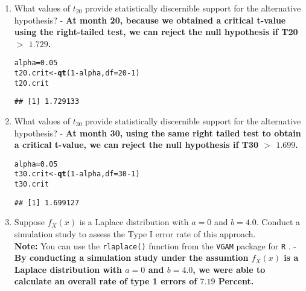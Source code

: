 \documentclass{article}\usepackage[]{graphicx}\usepackage[]{xcolor}
\makeatletter
\newcommand{\hlnum}[1]{\textcolor[rgb]{0.686,0.059,0.569}{#1}}%
\newcommand{\hlopt}[1]{\textcolor[rgb]{0,0,0}{#1}}%
\newcommand{\hldef}[1]{\textcolor[rgb]{0.345,0.345,0.345}{#1}}%
\newcommand{\hlkwb}[1]{\textcolor[rgb]{0.69,0.353,0.396}{#1}}%
\newcommand{\hlkwc}[1]{\textcolor[rgb]{0.333,0.667,0.333}{#1}}%
\newcommand{\hlkwd}[1]{\textcolor[rgb]{0.737,0.353,0.396}{\textbf{#1}}}%
\newenvironment{kframe}{%
 \def\at@end@of@kframe{}%
 \ifinner\ifhmode%
  \def\at@end@of@kframe{\end{minipage}}%
  \begin{minipage}{\columnwidth}%
 \fi\fi%
 \def\FrameCommand##1{\hskip\@totalleftmargin \hskip-\fboxsep
 \colorbox{shadecolor}{##1}\hskip-\fboxsep
     \hskip-\linewidth \hskip-\@totalleftmargin \hskip\columnwidth}%
 \MakeFramed {\advance\hsize-\width
   \@totalleftmargin\z@ \linewidth\hsize
   \@setminipage}}%
 {\par\unskip\endMakeFramed%
 \at@end@of@kframe}
\newenvironment{knitrout}{}{} %
\makeatother
\begin{document}
\begin{enumerate}
\begin{enumerate}
  \item What values of $t_{20}$ provide statistically discernible support for the
  alternative hypothesis? - \textbf{At month 20, because we obtained a critical t-value using the right-tailed test, we can reject the null hypothesis if T20 $>$ $1.729$.}
\begin{knitrout}\scriptsize
{}\color{fgcolor}\begin{kframe}
\begin{alltt}
\hldef{alpha} \hlkwb{=} \hlnum{0.05}
\hldef{t20.crit} \hlkwb{<-} \hlkwd{qt}\hldef{(}\hlnum{1}\hlopt{-}\hldef{alpha,} \hlkwc{df} \hldef{=} \hlnum{20} \hlopt{-} \hlnum{1}\hldef{)}
\hldef{t20.crit}
\end{alltt}
\begin{verbatim}
## [1] 1.729133
\end{verbatim}
\end{kframe}
\end{knitrout}
  \item What values of $t_{30}$ provide statistically discernible support for the
  alternative hypothesis? - \textbf{At month 30, using the same right tailed test to obtain a critical t-value, we can reject the null hypothesis if T30 $>$ $1.699$.}
\begin{knitrout}\scriptsize
{}\color{fgcolor}\begin{kframe}
\begin{alltt}
\hldef{alpha} \hlkwb{=} \hlnum{0.05}
\hldef{t30.crit} \hlkwb{<-} \hlkwd{qt}\hldef{(}\hlnum{1}\hlopt{-}\hldef{alpha,} \hlkwc{df} \hldef{=} \hlnum{30} \hlopt{-} \hlnum{1}\hldef{)}
\hldef{t30.crit}
\end{alltt}
\begin{verbatim}
## [1] 1.699127
\end{verbatim}
\end{kframe}
\end{knitrout}
  \item Suppose $f_X(x)$ is a Laplace distribution with $a=0$ and $b=4.0$.
  Conduct a simulation study to assess the Type I error rate of this approach.\\
  \textbf{Note:} You can use the \texttt{rlaplace()} function from the \texttt{VGAM}
  package for \texttt{R} \citep{VGAM}. - \textbf{By conducting a simulation study under the assumtion $f_X(x)$ is a Laplace distribution with $a=0$ and $b=4.0$, we were able to calculate an overall rate of type 1 errors of $7.19$ Percent. }
  

\end{enumerate}
\end{enumerate}
\end{document}
